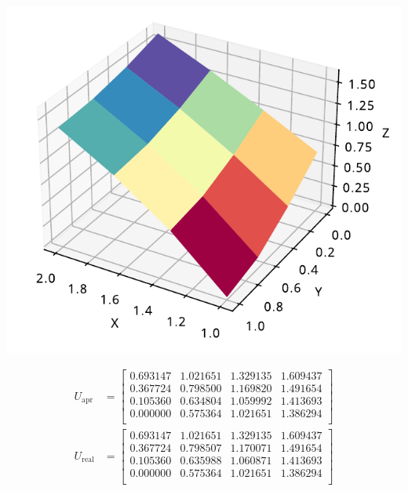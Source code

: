 \documentclass[a4paper, 11pt]{report}
\begin{document}
\begin{enumerate}[leftmargin=*]
    \begin{minipage}{0.35\columnwidth}
        \includegraphics[width=\columnwidth]{../edp/12.1_2.pdf}
    \end{minipage}
    \begin{minipage}{0.6\columnwidth}
        \begin{align*}
            U_{\text{apr}} &= 
            \begin{bmatrix}
                0.693147 & 1.021651 & 1.329135 & 1.609437\\
                0.367724 & 0.798500 & 1.169820 & 1.491654\\
                0.105360 & 0.634804 & 1.059992 & 1.413693\\
                0.000000 & 0.575364 & 1.021651 & 1.386294\\
            \end{bmatrix}\\
            U_{\text{real}} &=
            \begin{bmatrix}
                0.693147 & 1.021651 & 1.329135 & 1.609437\\
                0.367724 & 0.798507 & 1.170071 & 1.491654\\
                0.105360 & 0.635988 & 1.060871 & 1.413693\\
                0.000000 & 0.575364 & 1.021651 & 1.386294\\
            \end{bmatrix}\\

\end{align*}
\end{minipage}
\end{enumerate}
\end{document}

